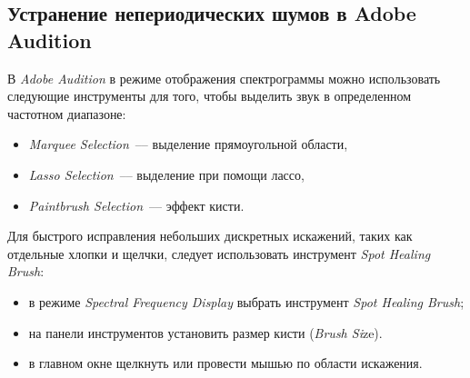\documentclass{beamer}
\begin{document}
\subsection{Устранение непериодических шумов в Adobe Audition}
\begin{frame}
В \textit{Adobe Audition} в режиме отображения спектрограммы можно использовать следующие инструменты для того, чтобы выделить звук в определенном частотном диапазоне:
\begin{itemize}
\item \textit{Marquee Selection}~--– выделение прямоугольной области,
\item \textit{Lasso Selection}~--– выделение при помощи лассо,
\item \textit{Paintbrush Selection}~--– эффект кисти.
\end{itemize}
\end{frame}

\begin{frame}
Для быстрого исправления небольших дискретных искажений, таких как отдельные хлопки и щелчки, следует использовать инструмент \textit{Spot Healing Brush}:
\begin{itemize}
\item в режиме \textit{Spectral Frequency Display} выбрать инструмент \textit{Spot Healing Brush};
\item на панели инструментов установить размер кисти (\textit{Brush Si}ze).
\item в главном окне щелкнуть или провести мышью по области искажения.
\end{itemize}
\end{frame}
\end{document}
